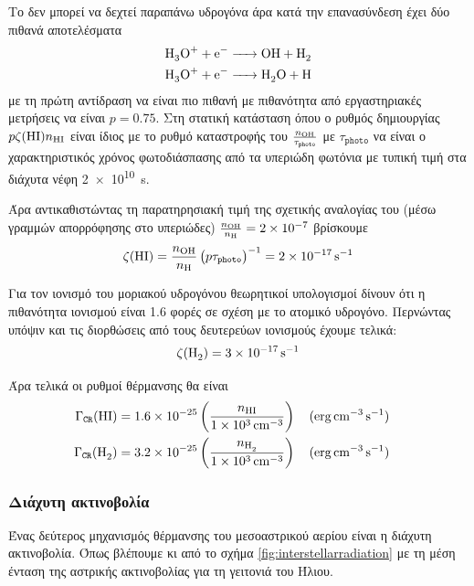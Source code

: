 Το  δεν μπορεί να δεχτεί παραπάνω υδρογόνα άρα κατά την επανασύνδεση έχει δύο πιθανά αποτελέσματα
\begin{align}
\ce{H3O^+ + e^- &-> OH + H2} \\
\ce{H3O^+ + e^- &-> H2O + H}
\end{align}
με τη πρώτη αντίδραση να είναι πιο πιθανή με πιθανότητα από εργαστηριακές μετρήσεις να είναι $p=\num{0.75}$. Στη στατική κατάσταση όπου ο ρυθμός  δημιουργίας  $p  \zeta (\ce{HI}) n_{\ce{HI}}$ είναι ίδιος με το ρυθμό καταστροφής του $\frac{n_{\ce{OH}}}{\tau _\mathtt{photo}}$ με $\tau _\mathtt{photo}$ να είναι ο χαρακτηριστικός χρόνος φωτοδιάσπασης από τα υπεριώδη φωτόνια με τυπική τιμή στα διάχυτα νέφη \SI{2e10}{s}.

Άρα αντικαθιστώντας τη παρατηρησιακή τιμή της σχετικής αναλογίας του  (μέσω γραμμών απορρόφησης στο υπεριώδες) $\frac{n_{\ce{OH}}}{n_{\ce{H}}} = \num{2e-7}$ βρίσκουμε
\begin{equation}
\zeta (\ce{HI}) = \frac{n_{\ce{OH}}}{n_{\ce{H}}} \left(p \tau _\mathtt{photo} \right) ^{-1} = \SI{2e-17}{s^{-1}}
\end{equation}

Για τον ιονισμό του μοριακού υδρογόνου θεωρητικοί υπολογισμοί δίνουν ότι η πιθανότητα ιονισμού είναι \num{1.6} φορές σε σχέση με το ατομικό υδρογόνο. Περνώντας υπόψιν και τις διορθώσεις από τους δευτερεύων ιονισμούς έχουμε τελικά:
\begin{equation}
\zeta (\ce{H2})=\SI{3e-17}{s^{-1}}
\end{equation}

Άρα τελικά οι ρυθμοί θέρμανσης θα είναι
\begin{align}
\Gamma _\mathtt{CR} (\ce{HI}) &= \num{1.6e-25} \left( \frac{n_{\ce{HI}}}{\SI{1e3}{cm^{-3}}} \right) \qq{(\si{erg.cm^{-3}.s^{-1}})} \\
\Gamma _\mathtt{CR} (\ce{H2}) &= \num{3.2e-25} \left( \frac{n_{\ce{H2}}}{\SI{1e3}{cm^{-3}}} \right) \qq{(\si{erg.cm^{-3}.s^{-1}})} 
\end{align}

\subsubsection{Διάχυτη ακτινοβολία}

Ένας δεύτερος μηχανισμός θέρμανσης του μεσοαστρικού αερίου είναι η διάχυτη ακτινοβολία. Όπως βλέπουμε κι από το σχήμα \ref{fig:interstellarradiation} με τη μέση ένταση της αστρικής ακτινοβολίας για τη γειτονιά του Ήλιου. 

